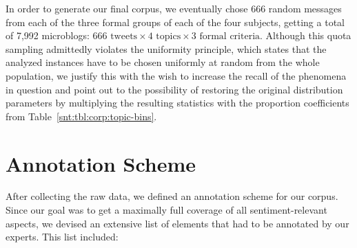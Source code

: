 
In order to generate our final corpus, we eventually chose 666 random
messages from each of the three formal groups of each of the four
subjects, getting a total of 7,992 microblogs: $666\text{ tweets}
\times 4\text{ topics} \times 3\text{ formal criteria}$.  Although
this quota sampling admittedly violates the uniformity principle,
which states that the analyzed instances have to be chosen uniformly
at random from the whole population, we justify this with the wish to
increase the recall of the phenomena in question and point out to the
possibility of restoring the original distribution parameters by
multiplying the resulting statistics with the proportion coefficients
from Table~\ref{snt:tbl:corp:topic-bins}.

\section{Annotation Scheme}\label{subsec:snt:ascheme}
After collecting the raw data, we defined an annotation scheme for our
corpus. Since our goal was to get a maximally full coverage of all
sentiment-relevant aspects, we devised an extensive list of elements
that had to be annotated by our experts.  This list included:

